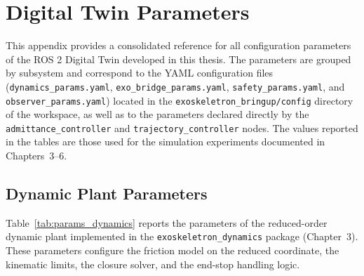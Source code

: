 
\appendix
\chapter{Digital Twin Parameters}
\label{app:parameters}

This appendix provides a consolidated reference for all configuration parameters of the ROS 2 Digital Twin developed in this thesis. The parameters are grouped by subsystem and correspond to the YAML
configuration files (\texttt{dynamics\_params.yaml}, \texttt{exo\_bridge\_params.yaml}, \texttt{safety\_params.yaml}, and \texttt{observer\_params.yaml}) located in the \texttt{exoskeletron\_bringup/config} directory of the workspace, as well as to the parameters declared directly by the \texttt{admittance\_controller} and \newline \texttt{trajectory\_controller} nodes. The values reported in the tables are those used for the simulation experiments documented in Chapters~3--6.
\newline
\null 
\newline


\section{Dynamic Plant Parameters}
\label{app:params:dynamics}

Table~\ref{tab:params_dynamics} reports the parameters of the reduced-order dynamic plant implemented in the \texttt{exoskeletron\_dynamics} package (Chapter~3). These parameters configure the friction model on the reduced coordinate, the kinematic limits, the closure solver, and the end-stop handling logic.

